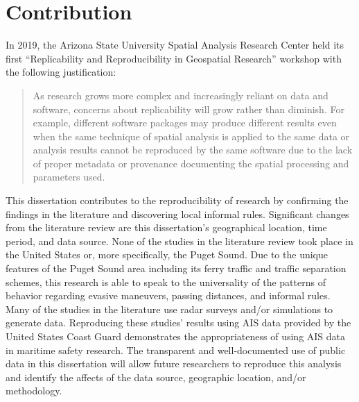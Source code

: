 \documentclass[twoside,symmetric,notoc]{tufte-book}
\begin{document}
\section{Contribution}
\par{%
In 2019, the Arizona State University Spatial Analysis Research Center held its first ``Replicability and Reproducibility in Geospatial Research'' workshop with the following justification:
\begin{quotation}
As research grows more complex and increasingly reliant on data and software, concerns about replicability will grow rather than diminish. For example, different software packages may produce different results even when the same technique of spatial analysis is applied to the same data or analysis results cannot be reproduced by the same software due to the lack of proper metadata or provenance documenting the spatial processing and parameters used.\cite{ASU}
\end{quotation}
This dissertation contributes to the reproducibility of research by confirming the findings in the literature and discovering local informal rules. Significant changes from the literature review are this dissertation's geographical location, time period, and data source. None of the studies in the literature review took place in the United States or, more specifically, the Puget Sound. Due to the unique features of the Puget Sound area including its ferry traffic and traffic separation schemes, this research is able to speak to the universality of the patterns of behavior regarding evasive maneuvers, passing distances, and informal rules. Many of the studies in the literature use radar surveys and/or simulations to generate data. Reproducing these studies' results using AIS data provided by the United States Coast Guard demonstrates the appropriateness of using AIS data in maritime safety research. The transparent and well-documented use of public data in this dissertation will allow future researchers to reproduce this analysis and identify the affects of the data source, geographic location, and/or methodology.
}
\end{document}
